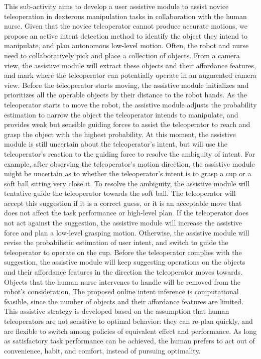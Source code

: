 \documentclass[letterpaper, 11 pt, onecolumn]{article}
\begin{document}
This sub-activity aims to develop a user assistive module to assist novice teleoperation in dexterous manipulation tasks in collaboration with the human nurse. Given that the novice teleoperator cannot produce accurate motions, we propose an active intent detection method to identify the object they intend to manipulate, and plan autonomous low-level motion. Often, the robot and nurse need to collaboratively pick and place a collection of objects. From a camera view, the assistive module will extract these objects and their affordance features, and mark where the teleoperator can potentially operate in an augmented camera view. Before the teleoperator starts moving, the assistive module initializes and prioritizes all the operable objects by their distance to the robot hands. As the teleoperator starts to move the robot, the assistive module adjusts the probability estimation to narrow the object the teleoperator intends to manipulate, and provides weak but sensible guiding forces to assist the teleoperator to reach and grasp the object with the highest probability. At this moment, the assistive module is still uncertain about the teleoperator's intent, but will use the teleoperator's reaction to the guiding force to resolve the ambiguity of intent. For example, after observing the teleoperator's motion direction, the assistive module might be uncertain as to whether the teleoperator's intent is to grasp a cup or a soft ball sitting very close it. To resolve the ambiguity, the assistive module will tentative guide the teleoperator towards the soft ball. The teleoperator will accept this suggestion if it is a correct guess, or it is an acceptable move that does not affect the task performance or high-level plan. If the teleoperator does not act against the suggestion, the assistive module will increase the assistive force and plan a low-level grasping motion. Otherwise, the assistive module will revise the probabilistic estimation of user intent, and switch to guide the teleoperator to operate on the cup. Before the teleoperator complies with the suggestion, the assistive module will keep suggesting operations on the objects and their affordance features in the direction the teleoperator moves towards. Objects that the human nurse intervenes to handle will be removed from the robot's consideration. The proposed online intent inference is computational feasible, since the number of objects and their affordance features are limited. This assistive strategy is developed based on the assumption that human teleoperators are not sensitive to optimal behavior: they can re-plan quickly, and are flexible to switch among policies of equivalent effect and performance. As long as satisfactory task performance can be achieved, the human prefers to act out of convenience, habit, and comfort, instead of pursuing optimality.
\end{document}
